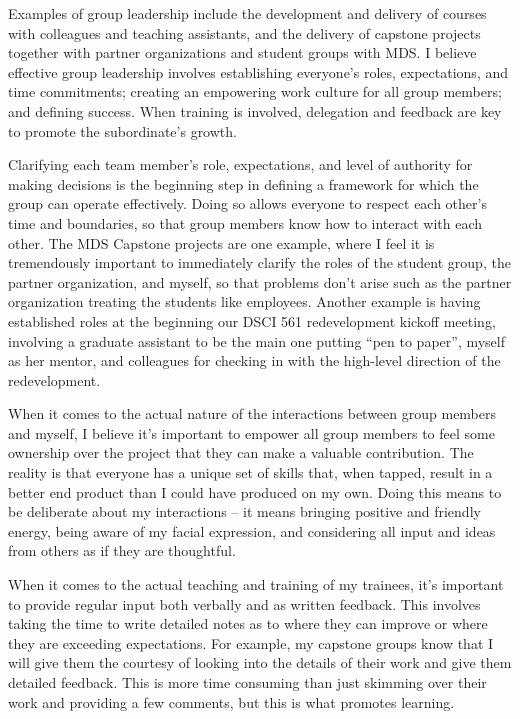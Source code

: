 \documentclass[]{article}
\begin{document}
Examples of group leadership include the development and delivery of courses with colleagues and teaching assistants, and the delivery of capstone projects together with partner organizations and student groups with MDS. I believe effective group leadership involves establishing everyone's roles, expectations, and time commitments; creating an empowering work culture for all group members; and defining success. When training is involved, delegation and feedback are key to promote the subordinate's growth.

Clarifying each team member's role, expectations, and level of authority for making decisions is the beginning step in defining a framework for which the group can operate effectively. Doing so allows everyone to respect each other's time and boundaries, so that group members know how to interact with each other. The MDS Capstone projects are one example, where I feel it is tremendously important to immediately clarify the roles of the student group, the partner organization, and myself, so that problems don't arise such as the partner organization treating the students like employees. Another example is having established roles at the beginning our DSCI 561 redevelopment kickoff meeting, involving a graduate assistant to be the main one putting ``pen to paper'', myself as her mentor, and colleagues for checking in with the high-level direction of the redevelopment.

When it comes to the actual nature of the interactions between group members and myself, I believe it's important to empower all group members to feel some ownership over the project that they can make a valuable contribution. The reality is that everyone has a unique set of skills that, when tapped, result in a better end product than I could have produced on my own. Doing this means to be deliberate about my interactions -- it means bringing positive and friendly energy, being aware of my facial expression, and considering all input and ideas from others as if they are thoughtful.

When it comes to the actual teaching and training of my trainees, it's important to provide regular input both verbally and as written feedback. This involves taking the time to write detailed notes as to where they can improve or where they are exceeding expectations. For example, my capstone groups know that I will give them the courtesy of looking into the details of their work and give them detailed feedback. This is more time consuming than just skimming over their work and providing a few comments, but this is what promotes learning.
\end{document}
